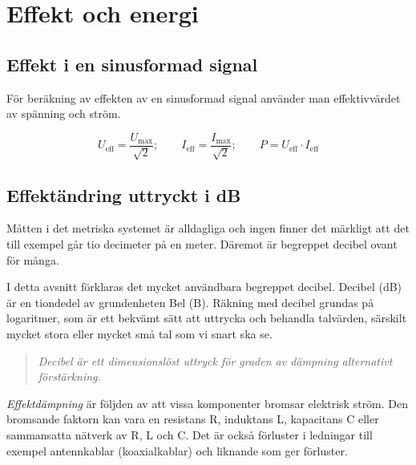 \section{Effekt och energi}
\label{effect och energi}

\subsection{Effekt i en sinusformad signal}

För beräkning av effekten av en sinusformad signal använder man effektivvärdet
av spänning och ström.

\[
	U_{\mathrm{eff}} = \frac{U_{\mathrm{max}}}{\sqrt{2}}; \qquad
	I_{\mathrm{eff}} = \frac{I_{\mathrm{max}}}{\sqrt{2}}; \qquad
	P = U_{\mathrm{eff}} \cdot I_{\mathrm{eff}}
\]

\subsection{Effektändring uttryckt i dB}
\label{decibel}

Måtten i det metriska systemet är alldagliga och ingen finner det märkligt att
det till exempel går tio decimeter på en meter.
Däremot är begreppet decibel ovant för många.

I detta avsnitt förklaras det mycket användbara begreppet decibel.
Decibel (dB) är en tiondedel av grundenheten Bel (B). Räkning med decibel grundas 
på logaritmer, som är ett bekvämt sätt att uttrycka och behandla talvärden, 
särskilt mycket stora eller mycket små tal som vi snart ska se.

\begin{quote}
	\emph{Decibel är ett dimensionslöst uttryck för graden av dämpning alternativt
		förstärkning.}
\end{quote}

\emph{Effektdämpning} är följden av att vissa komponenter bromsar elektrisk
ström. Den bromsande faktorn kan vara en resistans R, induktans L, kapacitans C eller
sammansatta nätverk av R, L och C. Det är också förluster i ledningar till exempel
antennkablar (koaxialkablar) och liknande som ger förluster.


